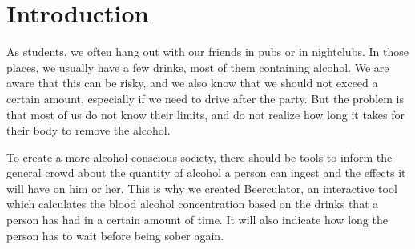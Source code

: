 \section{Introduction}
\label{sec:intro}

As students, we often hang out with our friends in pubs or in nightclubs. In those places, we usually have a few drinks, most of them containing alcohol. We are aware that this can be risky, and we also know that we should not exceed a certain amount, especially if we need to drive after the party. But the problem is that most of us do not know their limits, and do not realize how long it takes for their body to remove the alcohol. 

To create a more alcohol-conscious society, there should be tools to inform the general crowd about the quantity of alcohol a person can ingest and the effects it will have on him or her. This is why we created Beerculator, an interactive tool which calculates the blood alcohol concentration based on the drinks that a person has had in a certain amount of time. It will also indicate how long the person has to wait before being sober again.
